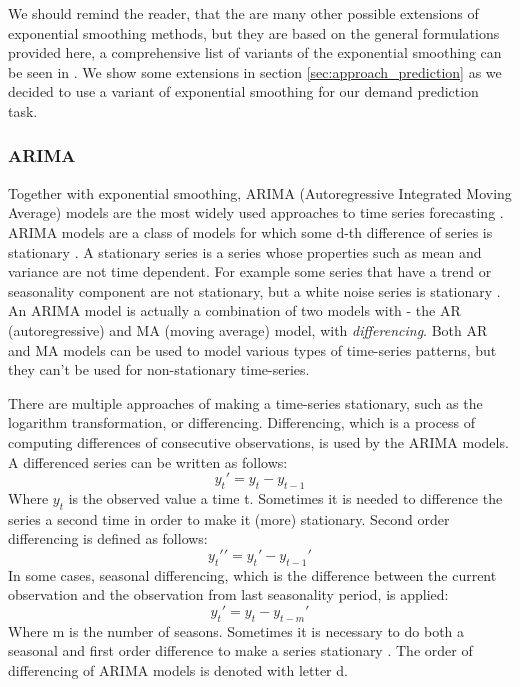 \documentclass[11pt,a4paper]{article}
\begin{document}
We should remind the reader, that the are many other possible extensions of exponential smoothing methods, but they are based on the general formulations provided here, a comprehensive list of variants of the exponential smoothing can be seen in \cite{hyndman2014forecasting}. We show some extensions in section \ref{sec:approach_prediction} as we decided to use a variant of exponential smoothing for our demand prediction task.

\subsubsection{ARIMA}
Together with exponential smoothing, ARIMA (Autoregressive Integrated Moving Average) models are the most widely used approaches to time series forecasting \cite{hyndman2014forecasting}.
ARIMA models are a class of models for which some d-th difference of series is stationary \cite{box2015time}. A stationary series is a series whose properties such as mean and variance are not time dependent. For example some series that have a trend or seasonality component are not stationary, but a white noise series is stationary \cite{hyndman2014forecasting}.
An ARIMA model is actually a combination of two models with - the AR (autoregressive) and MA (moving average) model, with \textit{differencing}. Both AR and MA models can be used to model various types of time-series patterns, but they can't be used for non-stationary time-series. 

There are multiple approaches of making a time-series stationary, such as the logarithm transformation, or differencing.
Differencing, which is a process of computing differences of consecutive observations, is used by the ARIMA models.
A differenced series can be written as follows:
\begin{equation}
y_{t}\prime = y_t - y_{t-1}
\end{equation}
Where $y_t$ is the observed value a time t.
Sometimes it is needed to difference the series a second time in order to make it (more) stationary. Second order differencing is defined as follows:
\begin{equation}
y_{t}\prime\prime = y_t\prime - y_{t-1}\prime
\end{equation}
In some cases, seasonal differencing, which is the difference between the current observation and the observation from last seasonality period, is applied:
\begin{equation}
y_{t}\prime = y_t - y_{t-m}\prime
\end{equation}
Where m is the number of seasons. Sometimes it is necessary to do both a seasonal and first order difference to make a series stationary \cite{hyndman2014forecasting}. The order of differencing of ARIMA models is denoted with letter d.
\end{document}
